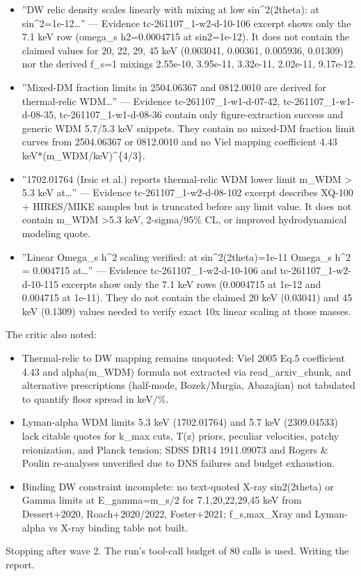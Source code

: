 \documentclass[11pt,a4paper]{article}
\begin{document}
\begin{itemize}
  \item ''DW relic density scales linearly with mixing at low sin\textasciicircum{}2(2theta): at sin\textasciicircum{}2=1e-12\ldots{}'' --- Evidence tc-261107\_1-w2-d-10-106 excerpt shows only the 7.1 keV row (omega\_s h2=0.0004715 at sin2=1e-12). It does not contain the claimed values for 20, 22, 29, 45 keV (0.003041, 0.00361, 0.005936, 0.01309) nor the derived f\_s=1 mixings 2.55e-10, 3.95e-11, 3.32e-11, 2.02e-11, 9.17e-12.
  \item ''Mixed-DM fraction limits in 2504.06367 and 0812.0010 are derived for thermal-relic WDM\ldots{}'' --- Evidence tc-261107\_1-w1-d-07-42, tc-261107\_1-w1-d-08-35, tc-261107\_1-w1-d-08-36 contain only figure-extraction success and generic WDM 5.7/5.3 keV snippets. They contain no mixed-DM fraction limit curves from 2504.06367 or 0812.0010 and no Viel mapping coefficient 4.43 keV*(m\_WDM/keV)\textasciicircum{}\{4/3\}.
  \item ''1702.01764 (Irsic et al.) reports thermal-relic WDM lower limit m\_WDM \textgreater{} 5.3 keV at\ldots{}'' --- Evidence tc-261107\_1-w2-d-08-102 excerpt describes XQ-100 + HIRES/MIKE samples but is truncated before any limit value. It does not contain m\_WDM \textgreater{}5.3 keV, 2-sigma/95\% CL, or improved hydrodynamical modeling quote.
  \item ''Linear Omega\_s h\textasciicircum{}2 scaling verified: at sin\textasciicircum{}2(2theta)=1e-11 Omega\_s h\textasciicircum{}2 = 0.004715 at\ldots{}'' --- Evidence tc-261107\_1-w2-d-10-106 and tc-261107\_1-w2-d-10-115 excerpts show only the 7.1 keV rows (0.0004715 at 1e-12 and 0.004715 at 1e-11). They do not contain the claimed 20 keV (0.03041) and 45 keV (0.1309) values needed to verify exact 10x linear scaling at those masses.
\end{itemize}
The critic also noted:

\begin{itemize}
  \item Thermal-relic to DW mapping remains unquoted: Viel 2005 Eq.5 coefficient 4.43 and alpha(m\_WDM) formula not extracted via read\_arxiv\_chunk, and alternative prescriptions (half-mode, Bozek/Murgia, Abazajian) not tabulated to quantify floor spread in keV/\%.
  \item Lyman-alpha WDM limits 5.3 keV (1702.01764) and 5.7 keV (2309.04533) lack citable quotes for k\_max cuts, T(z) priors, peculiar velocities, patchy reionization, and Planck tension; SDSS DR14 1911.09073 and Rogers \& Poulin re-analyses unverified due to DNS failures and budget exhaustion.
  \item Binding DW constraint incomplete: no text-quoted X-ray sin2(2theta) or Gamma limits at E\_gamma=m\_s/2 for 7.1,20,22,29,45 keV from Dessert+2020, Roach+2020/2022, Foster+2021; f\_s,max\_Xray and Lyman-alpha vs X-ray binding table not built.
\end{itemize}
Stopping after wave 2. The run's tool-call budget of 80 calls is used. Writing the report.
\end{document}
